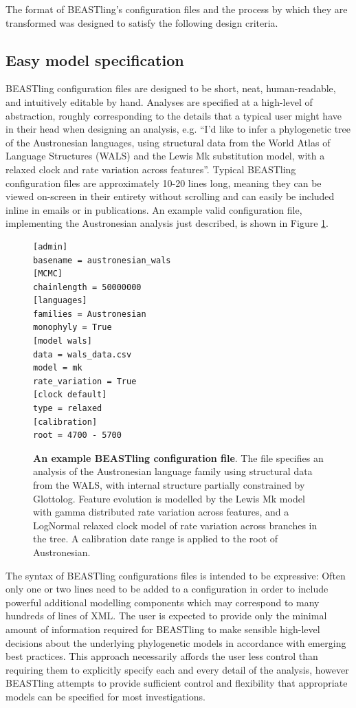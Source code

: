 \documentclass[10pt,a4paper]{article}
\begin{document}
The format of BEASTling's configuration files and the process by which they are transformed was designed to satisfy the following design criteria.

\subsection{Easy model specification}

BEASTling configuration files are designed to be short, neat, human-readable, and intuitively editable by hand.  Analyses are specified at a high-level of abstraction, roughly corresponding to the details that a typical user might have in their head when designing an analysis, e.g. ``I'd like to infer a phylogenetic tree of the Austronesian languages, using structural data from the World Atlas of Language Structures\cite{Dryer2013} (WALS) and the Lewis Mk substitution model\cite{Lewis2001}, with a relaxed clock and rate variation across features''.  Typical BEASTling configuration files are approximately 10-20 lines long, meaning they can be viewed on-screen in their entirety without scrolling and can easily be included inline in emails or in publications.  An example valid configuration file, implementing the Austronesian analysis just described, is shown in Figure \ref{fig:config}.

\begin{figure}[t]
	\begin{verbatim}[admin]
basename = austronesian_wals
[MCMC]
chainlength = 50000000
[languages]
families = Austronesian
monophyly = True
[model wals]
data = wals_data.csv
model = mk
rate_variation = True
[clock default]
type = relaxed
[calibration]
root = 4700 - 5700\end{verbatim}
\caption{\textbf{An example BEASTling configuration file}.  The file specifies an analysis of the Austronesian language family using structural data from the WALS, with internal structure partially constrained by Glottolog. Feature evolution is modelled by the Lewis Mk model with gamma distributed rate variation across features, and a LogNormal relaxed clock model of rate variation across branches in the tree.  A calibration date range is applied to the root of Austronesian.}
\label{fig:config}
\end{figure}

The syntax of BEASTling configurations files is intended to be expressive:  Often only one or two lines need to be added to a configuration in order to include powerful additional modelling components which may correspond to many hundreds of lines of XML.  The user is expected to provide only the minimal amount of information required for BEASTling to make sensible high-level decisions about the underlying phylogenetic models in accordance with emerging best practices.  This approach necessarily affords the user less control than requiring them to explicitly specify each and every detail of the analysis, however BEASTling attempts to provide sufficient control and flexibility that appropriate models can be specified for most investigations.
\end{document}

